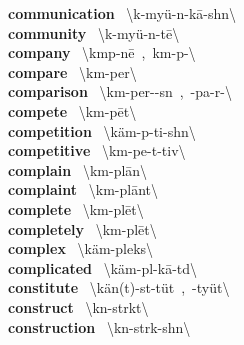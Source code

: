 \documentclass[10pt,a4paper]{article}
\begin{document}
\begin{multicols}{2}
\textbf{ communication }\quad \ \textbackslash k\textschwa -\textsecstress my\"{u}-n\textschwa -\textprimstress k\={a}-sh\textschwa n\textbackslash \\
\textbf{ community }\quad \ \textbackslash k\textschwa -\textprimstress my\"{u}-n\textschwa -t\={e}\textbackslash \\
\textbf{ company }\quad \ \textbackslash \textprimstress k\textschwa mp-n\={e}\ ,\ \textprimstress k\textschwa m-p\textschwa -\textbackslash \\
\textbf{ compare }\quad \ \textbackslash k\textschwa m-\textprimstress per\textbackslash \\
\textbf{ comparison }\quad \ \textbackslash k\textschwa m-\textprimstress per-\textschwa -s\textschwa n\ ,\ -\textprimstress pa-r\textschwa -\textbackslash \\
\textbf{ compete }\quad \ \textbackslash k\textschwa m-\textprimstress p\={e}t\textbackslash \\
\textbf{ competition }\quad \ \textbackslash \textsecstress k\"{a}m-p\textschwa -\textprimstress ti-sh\textschwa n\textbackslash \\
\textbf{ competitive }\quad \ \textbackslash k\textschwa m-\textprimstress pe-t\textschwa -tiv\textbackslash \\
\textbf{ complain }\quad \ \textbackslash k\textschwa m-\textprimstress pl\={a}n\textbackslash \\
\textbf{ complaint }\quad \ \textbackslash k\textschwa m-\textprimstress pl\={a}nt\textbackslash \\
\textbf{ complete }\quad \ \textbackslash k\textschwa m-\textprimstress pl\={e}t\textbackslash \\
\textbf{ completely }\quad \ \textbackslash k\textschwa m-\textprimstress pl\={e}t\textbackslash \\
\textbf{ complex }\quad \ \textbackslash \textprimstress k\"{a}m-\textsecstress pleks\textbackslash \\
\textbf{ complicated }\quad \ \textbackslash \textprimstress k\"{a}m-pl\textschwa -\textsecstress k\={a}-t\textschwa d\textbackslash \\
\textbf{ constitute }\quad \ \textbackslash \textprimstress k\"{a}n(t)-st\textschwa -\textsecstress t\"{u}t\ ,\ -\textsecstress ty\"{u}t\textbackslash \\
\textbf{ construct }\quad \ \textbackslash k\textschwa n-\textprimstress str\textschwa kt\textbackslash \\
\textbf{ construction }\quad \ \textbackslash k\textschwa n-\textprimstress str\textschwa k-sh\textschwa n\textbackslash \\

\end{multicols}
\end{document}
